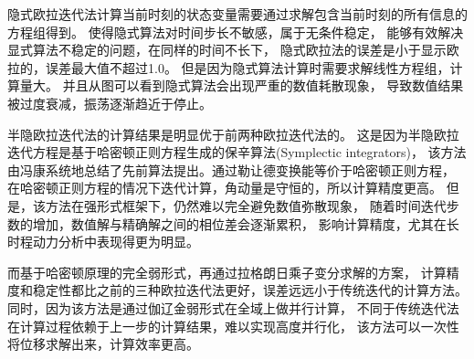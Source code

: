 隐式欧拉迭代法计算当前时刻的状态变量需要通过求解包含当前时刻的所有信息的方程组得到。
使得隐式算法对时间步长不敏感，属于无条件稳定，
能够有效解决显式算法不稳定的问题，在同样的时间不长下，
隐式欧拉法的误差是小于显示欧拉的，误差最大值不超过1.0。
但是因为隐式算法计算时需要求解线性方程组，计算量大。
并且从图可以看到隐式算法会出现严重的数值耗散现象，
导致数值结果被过度衰减，振荡逐渐趋近于停止。

半隐欧拉迭代法的计算结果是明显优于前两种欧拉迭代法的。
这是因为半隐欧拉迭代方程是基于哈密顿正则方程生成的保辛算法(Symplectic integrators)，
该方法由冯康系统地总结了先前算法提出。通过勒让德变换能等价于哈密顿正则方程，
在哈密顿正则方程的情况下迭代计算，角动量是守恒的，所以计算精度更高。
但是，该方法在强形式框架下，仍然难以完全避免数值弥散现象，
随着时间迭代步数的增加，数值解与精确解之间的相位差会逐渐累积，
影响计算精度，尤其在长时程动力分析中表现得更为明显。

而基于哈密顿原理的完全弱形式，再通过拉格朗日乘子变分求解的方案，
计算精度和稳定性都比之前的三种欧拉迭代法更好，误差远远小于传统迭代的计算方法。
同时，因为该方法是通过伽辽金弱形式在全域上做并行计算，
不同于传统迭代法在计算过程依赖于上一步的计算结果，难以实现高度并行化，
该方法可以一次性将位移求解出来，计算效率更高。

